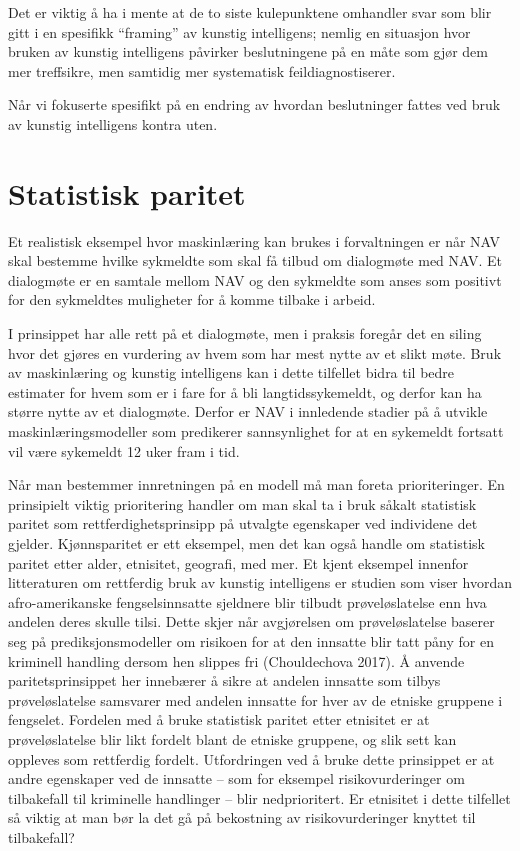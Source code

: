 \documentclass[
]{book}
\begin{document}
Det er viktig å ha i mente at de to siste kulepunktene omhandler svar som blir gitt i en spesifikk ``framing'' av kunstig intelligens; nemlig en situasjon hvor bruken av kunstig intelligens påvirker beslutningene på en måte som gjør dem mer treffsikre, men samtidig mer systematisk feildiagnostiserer.

Når vi fokuserte spesifikt på en endring av hvordan beslutninger fattes ved bruk av kunstig intelligens kontra uten.

\hypertarget{paritet}{%
\chapter{Statistisk paritet}\label{paritet}}

Et realistisk eksempel hvor maskinlæring kan brukes i forvaltningen er når NAV skal bestemme hvilke sykmeldte som skal få tilbud om dialogmøte med NAV.
Et dialogmøte er en samtale mellom NAV og den sykmeldte som anses som positivt for den sykmeldtes muligheter for å komme tilbake i arbeid.

I prinsippet har alle rett på et dialogmøte, men i praksis foregår det en siling hvor det gjøres en vurdering av hvem som har mest nytte av et slikt møte.
Bruk av maskinlæring og kunstig intelligens kan i dette tilfellet bidra til bedre estimater for hvem som er i fare for å bli langtidssykemeldt, og derfor kan ha større nytte av et dialogmøte.
Derfor er NAV i innledende stadier på å utvikle maskinlæringsmodeller som predikerer sannsynlighet for at en sykemeldt fortsatt vil være sykemeldt 12 uker fram i tid.

Når man bestemmer innretningen på en modell må man foreta prioriteringer.
En prinsipielt viktig prioritering handler om man skal ta i bruk såkalt statistisk paritet som rettferdighetsprinsipp på utvalgte egenskaper ved individene det gjelder.
Kjønnsparitet er ett eksempel, men det kan også handle om statistisk paritet etter alder, etnisitet, geografi, med mer.
Et kjent eksempel innenfor litteraturen om rettferdig bruk av kunstig intelligens er studien som viser hvordan afro-amerikanske fengselsinnsatte sjeldnere blir tilbudt prøveløslatelse enn hva andelen deres skulle tilsi.
Dette skjer når avgjørelsen om prøveløslatelse baserer seg på prediksjonsmodeller om risikoen for at den innsatte blir tatt påny for en kriminell handling dersom hen slippes fri (Chouldechova 2017).
Å anvende paritetsprinsippet her innebærer å sikre at andelen innsatte som tilbys prøveløslatelse samsvarer med andelen innsatte for hver av de etniske gruppene i fengselet.
Fordelen med å bruke statistisk paritet etter etnisitet er at prøveløslatelse blir likt fordelt blant de etniske gruppene, og slik sett kan oppleves som rettferdig fordelt.
Utfordringen ved å bruke dette prinsippet er at andre egenskaper ved de innsatte -- som for eksempel risikovurderinger om tilbakefall til kriminelle handlinger -- blir nedprioritert.
Er etnisitet i dette tilfellet så viktig at man bør la det gå på bekostning av risikovurderinger knyttet til tilbakefall?
\end{document}
